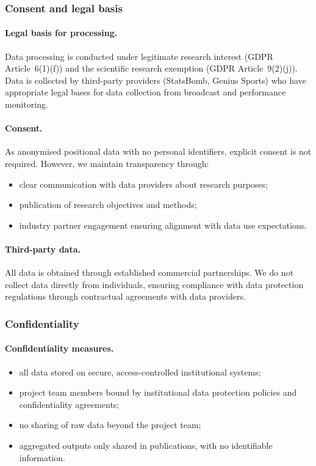 \subsubsection{Consent and legal basis}

\paragraph{Legal basis for processing.}
Data processing is conducted under legitimate research interest (GDPR Article~6(1)(f)) and the scientific research exemption (GDPR Article~9(2)(j)). Data is collected by third-party providers (StatsBomb, Genius Sports) who have appropriate legal bases for data collection from broadcast and performance monitoring.

\paragraph{Consent.}
As anonymised positional data with no personal identifiers, explicit consent is not required. However, we maintain transparency through:
\begin{itemize}
  \item clear communication with data providers about research purposes;
  \item publication of research objectives and methods;
  \item industry partner engagement ensuring alignment with data use expectations.
\end{itemize}

\paragraph{Third-party data.}
All data is obtained through established commercial partnerships. We do not collect data directly from individuals, ensuring compliance with data protection regulations through contractual agreements with data providers.

\subsubsection{Confidentiality}

\paragraph{Confidentiality measures.}
\begin{itemize}
  \item all data stored on secure, access-controlled institutional systems;
  \item project team members bound by institutional data protection policies and confidentiality agreements;
  \item no sharing of raw data beyond the project team;
  \item aggregated outputs only shared in publications, with no identifiable information.
\end{itemize}

